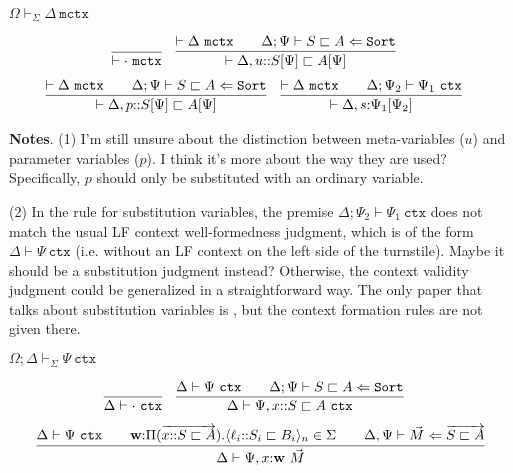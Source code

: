 \documentclass[letterpaper, 11pt]{article}
\newcommand{\Lar}{\Leftarrow}
\newcommand{\Sort}{\texttt{Sort}}
\newcommand{\ctx}{\texttt{ctx}}
\newcommand{\mctx}{\texttt{mctx}}
\begin{document}
    $\boxed{\Omega \vdash_\Sigma \Delta \ \mctx}$

    \begin{align*}
      & \infer{\vdash \cdot \ \mctx}{} &
      & \infer{\vdash \Delta, u{::} S[\Psi] \sqsubset A[\Psi]}
        {
          \vdash \Delta \ \mctx
          &&
          \Delta ; \Psi \vdash S \sqsubset A \Lar \Sort
        }
    \end{align*}
    \begin{align*}
      & \infer{\vdash \Delta, p{::} S[\Psi] \sqsubset A[\Psi]}
        {
          \vdash \Delta \ \mctx
          &&
          \Delta ; \Psi \vdash S \sqsubset A \Lar \Sort
        } &
      & \infer{\vdash \Delta, s{:} \Psi_1[\Psi_2]}
        {
          \vdash \Delta \ \mctx
          &&
          \Delta ; \Psi_2 \vdash \Psi_1 \ \ctx
        }
    \end{align*}

    \textbf{Notes}. (1) I'm still unsure about the distinction between meta-variables ($u$) and parameter variables ($p$).  I think it's more about 
    the way they are used?  Specifically, $p$ should only be substituted with an ordinary variable.

    (2) In the rule for substitution variables, the premise $\Delta ; \Psi_2 \vdash \Psi_1 \ \ctx$ does not match the usual LF context well-formedness
    judgment, which is of the form $\Delta \vdash \Psi \ \ctx$ (i.e. without an LF context on the left side of the turnstile).  Maybe it should be
    a substitution judgment instead?  Otherwise, the context validity judgment could be generalized in a straightforward way. The only paper that 
    talks about substitution variables is \cite{Pientka2008}, but the context formation rules are not given there.

    $\boxed{\Omega ; \Delta \vdash_\Sigma \Psi \ \ctx}$

    \begin{align*}
      & \infer{\Delta \vdash \cdot \ \ctx}{} &
      & \infer{\Delta \vdash \Psi, x {::}S \sqsubset A \ \ctx}
        {
          \Delta \vdash \Psi \ \ctx
          &&
          \Delta ; \Psi \vdash S \sqsubset A \Lar \Sort
        }
    \end{align*}
    \begin{align*}
      \infer{\Delta \vdash \Psi, x{:} \textbf{w} \ \vec{M}}
            {
              \Delta \vdash \Psi \ \ctx
              &&
              \textbf{w} {:} \Pi (\overrightarrow{x{::}S \sqsubset A}).\langle \ell_i {::} S_i \sqsubset B_i \rangle_n \in \Sigma
              &&
              \Delta, \Psi \vdash \vec{M} \Lar \overrightarrow{S \sqsubset A}
            }
    \end{align*}
\end{document}
